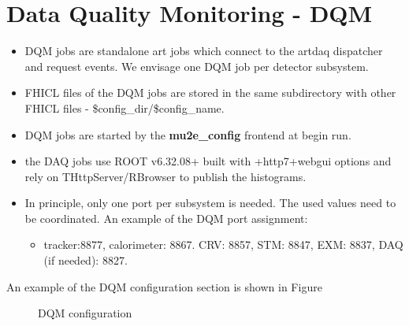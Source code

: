 \section {Data Quality Monitoring - DQM}

\begin{itemize}
\item 
  DQM jobs are standalone art jobs which connect to the artdaq dispatcher and request events.
  We envisage one DQM job per detector subsystem.
\item
  FHICL files of the DQM jobs are stored in the same subdirectory with other FHICL files -
  \$config\_dir/\$config\_name. 
\item
  DQM jobs are started by the {\bf mu2e\_config} frontend at begin run.
\item
  the DAQ jobs use ROOT v6.32.08+ built with +http7+webgui options and rely on THttpServer/RBrowser 
  to publish the histograms.
\item
  In principle, only one port per subsystem is needed. The used values need to be coordinated.
  An example of the DQM port assignment:
  \begin{itemize}
  \item 
    tracker:8877, calorimeter: 8867. CRV: 8857, STM: 8847, EXM: 8837, DAQ (if needed): 8827. 
  \end{itemize}
\end{itemize}

An example of the DQM configuration section is shown in Figure 
\begin{figure}[H]
  \caption{
    \label{figure:dqm_configuration}
    DQM configuration
  }
\end{figure}



